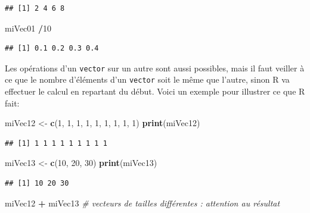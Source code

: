 \documentclass[]{book}
\newenvironment{Shaded}{\begin{snugshade}}{\end{snugshade}}
\newcommand{\KeywordTok}[1]{\textcolor[rgb]{0.13,0.29,0.53}{\textbf{#1}}}
\newcommand{\DecValTok}[1]{\textcolor[rgb]{0.00,0.00,0.81}{#1}}
\newcommand{\StringTok}[1]{\textcolor[rgb]{0.31,0.60,0.02}{#1}}
\newcommand{\CommentTok}[1]{\textcolor[rgb]{0.56,0.35,0.01}{\textit{#1}}}
\newcommand{\OperatorTok}[1]{\textcolor[rgb]{0.81,0.36,0.00}{\textbf{#1}}}
\newcommand{\NormalTok}[1]{#1}
\begin{document}
\begin{verbatim}
## [1] 2 4 6 8
\end{verbatim}

\begin{Shaded}
\begin{Highlighting}[]
\NormalTok{miVec01 }\OperatorTok{/}\DecValTok{10}
\end{Highlighting}
\end{Shaded}

\begin{verbatim}
## [1] 0.1 0.2 0.3 0.4
\end{verbatim}

Les opérations d'un \texttt{vector} sur un autre sont aussi possibles,
mais il faut veiller à ce que le nombre d'éléments d'un \texttt{vector}
soit le même que l'autre, sinon R va effectuer le calcul en repartant du
début. Voici un exemple pour illustrer ce que R fait:

\begin{Shaded}
\begin{Highlighting}[]
\NormalTok{miVec12 <-}\StringTok{ }\KeywordTok{c}\NormalTok{(}\DecValTok{1}\NormalTok{, }\DecValTok{1}\NormalTok{, }\DecValTok{1}\NormalTok{, }\DecValTok{1}\NormalTok{, }\DecValTok{1}\NormalTok{, }\DecValTok{1}\NormalTok{, }\DecValTok{1}\NormalTok{, }\DecValTok{1}\NormalTok{, }\DecValTok{1}\NormalTok{)}
\KeywordTok{print}\NormalTok{(miVec12)}
\end{Highlighting}
\end{Shaded}

\begin{verbatim}
## [1] 1 1 1 1 1 1 1 1 1
\end{verbatim}

\begin{Shaded}
\begin{Highlighting}[]
\NormalTok{miVec13 <-}\StringTok{ }\KeywordTok{c}\NormalTok{(}\DecValTok{10}\NormalTok{, }\DecValTok{20}\NormalTok{, }\DecValTok{30}\NormalTok{)}
\KeywordTok{print}\NormalTok{(miVec13)}
\end{Highlighting}
\end{Shaded}

\begin{verbatim}
## [1] 10 20 30
\end{verbatim}

\begin{Shaded}
\begin{Highlighting}[]
\NormalTok{miVec12 }\OperatorTok{+}\StringTok{ }\NormalTok{miVec13 }\CommentTok{# vecteurs de tailles différentes : attention au résultat}
\end{Highlighting}
\end{Shaded}
\end{document}
